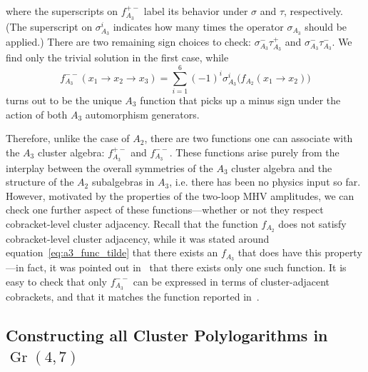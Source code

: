 \documentclass[12pt]{article}
\DeclareMathOperator{\Gr}{Gr}
\begin{document}
where the superscripts on $f_{A_3}^{+-}$ label its behavior under $\sigma$ and $\tau$, respectively. (The superscript on $\sigma_{A_3}^i$ indicates how many times the operator $\sigma_{A_3}$ should be applied.) There are two remaining sign choices to check: $\sigma^-_{A_3}\tau^+_{A_3}$ and $\sigma^-_{A_3}\tau^-_{A_3}$. We find only the trivial solution in the first case, while		
\begin{equation} \label{eq:fA3mm}
	f_{A_3}^{--}(x_1\to x_2\to x_3) =\sum_{i=1}^6(-1)^i\sigma_{A_3}^i \big(f_{A_2}(x_1\to x_2)\big)
\end{equation}
turns out to be the unique $A_3$ function that picks up a minus sign under the action of both $A_3$ automorphism generators.

Therefore, unlike the case of $A_2$, there are two functions one can associate with the $A_3$ cluster algebra: $f_{A_3}^{+-}$ and $f_{A_3}^{--}$. These functions arise purely from the interplay between the overall symmetries of the $A_3$ cluster algebra and the structure of the $A_2$ subalgebras in $A_3$, i.e. there has been no physics input so far. However, motivated by the properties of the two-loop MHV amplitudes, we can check one further aspect of these functions---whether or not they respect cobracket-level cluster adjacency. Recall that the function $f_{A_2}$ does not satisfy cobracket-level cluster adjacency, while it was stated around equation~\eqref{eq:a3_func_tilde} that there exists an $f_{A_3}$ that does have this property---in fact, it was pointed out in~\cite{Golden:2014xqa} that there exists only one such function. It is easy to check that only $f_{A_3}^{--}$ can be expressed in terms of cluster-adjacent cobrackets, and that it matches the function reported in~\cite{Golden:2014xqa}. 

\subsection{Constructing all Cluster Polylogarithms in $\Gr(4,7)$} \label{sec:all_nonclassical_polylogs_gr47}
\end{document}
